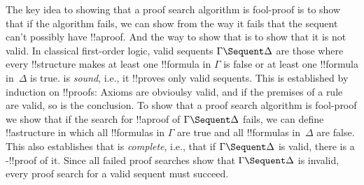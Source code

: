 \documentclass[../../../include/open-logic-section]{subfiles}
\begin{document}
The key idea to showing that a proof search algorithm is fool-proof is
to show that if the algorithm fails, we can show from the way it fails
that the sequent can't possibly have !!a{proof}. And the way to show
that is to show that it is not valid. In classical first-order logic,
valid sequents $\Gamma \Sequent \Delta$ are those where every
!!{structure} makes at least one !!{formula} in $\Gamma$ is false or
at least one !!{formula} in~$\Delta$ is true.  is
\emph{sound}, i.e., it !!{prove}s only valid sequents. This is
established by induction on !!{proof}s: Axioms are obvioulsy valid,
and if the premises of a rule are valid, so is the conclusion. To show
that a proof search algorithm is fool-proof we show that if the search
for !!a{proof} of $\Gamma \Sequent \Delta$ fails, we can define
!!a{structure} in which all !!{formula}s in $\Gamma$ are true and all
!!{formula}s in~$\Delta$ are false. This also establishes that
 is \emph{complete}, i.e., that if $\Gamma \Sequent \Delta$
is valid, there is a -!!{proof} of it. Since all failed
proof searches show that $\Gamma \Sequent \Delta$ is invalid, every
proof search for a valid sequent must succeed.
\end{document}

